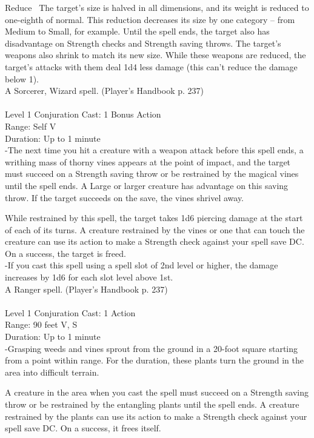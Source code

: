 \documentclass[10pt,twocolumn]{report}
\begin{document}
Reduce 
The target’s size is halved in all dimensions, and its weight is reduced to one-eighth of normal. This reduction decreases its size by one category – from Medium to Small, for example. Until the spell ends, the target also has disadvantage on Strength checks and Strength saving throws. The target’s weapons also shrink to match its new size. While these weapons are reduced, the target’s attacks with them deal 1d4 less damage (this can’t reduce the damage below 1).\\
A Sorcerer, Wizard spell. (Player's Handbook p. 237) \\


 \\
Level 1 \quad Conjuration \quad Cast: 1 Bonus Action\\
Range: Self \quad V\\
Duration: Up to 1 minute \quad \\
-The next time you hit a creature with a weapon attack before this spell ends, a writhing mass of thorny vines appears at the point of impact, and the target must succeed on a Strength saving throw or be restrained by the magical vines until the spell ends. A Large or larger creature has advantage on this saving throw. If the target succeeds on the save, the vines shrivel away. 

While restrained by this spell, the target takes 1d6 piercing damage at the start of each of its turns. A creature restrained by the vines or one that can touch the creature can use its action to make a Strength check against your spell save DC. On a success, the target is freed.\\
-If you cast this spell using a spell slot of 2nd level or higher, the damage increases by 1d6 for each slot level above 1st.\\
A Ranger spell. (Player's Handbook p. 237) \\


 \\
Level 1 \quad Conjuration \quad Cast: 1 Action\\
Range: 90 feet \quad V, S\\
Duration: Up to 1 minute \quad \\
-Grasping weeds and vines sprout from the ground in a 20-foot square starting from a point within range. For the duration, these plants turn the ground in the area into difficult terrain. 

A creature in the area when you cast the spell must succeed on a Strength saving throw or be restrained by the entangling plants until the spell ends. A creature restrained by the plants can use its action to make a Strength check against your spell save DC. On a success, it frees itself. 
\end{document}
